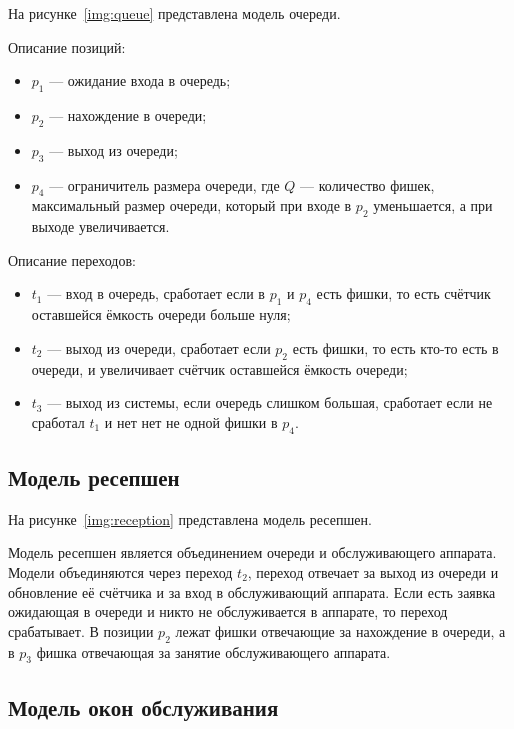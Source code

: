 На рисунке~\ref{img:queue} представлена модель очереди.

\FloatBarrier

Описание позиций:
\begin{itemize}[label=---]
	\item $p_1$ --- ожидание входа в очередь;
	\item $p_2$ --- нахождение в очереди;
	\item $p_3$ --- выход из очереди;
	\item $p_4$ --- ограничитель размера очереди, где $Q$ --- количество фишек, максимальный размер очереди, который при входе в $p_2$ уменьшается, а при выходе увеличивается.
\end{itemize}

Описание переходов:
\begin{itemize}[label=---]
	\item $t_1$ --- вход в очередь, сработает если в $p_1$ и $p_4$ есть фишки, то есть счётчик оставшейся ёмкость очереди больше нуля;
	\item $t_2$ --- выход из очереди, сработает если $p_2$ есть фишки, то есть кто-то есть в очереди, и увеличивает счётчик оставшейся ёмкость очереди;
	\item $t_3$ --- выход из системы, если очередь слишком большая, сработает если не сработал $t_1$ и нет нет не одной фишки в $p_4$.
\end{itemize}

\subsection{Модель ресепшен}

На рисунке~\ref{img:reception} представлена модель ресепшен.

\FloatBarrier

Модель ресепшен является объединением очереди и обслуживающего аппарата. Модели объединяются через переход $t_2$, переход отвечает за выход из очереди и обновление её счётчика и за вход в обслуживающий аппарата. Если есть заявка ожидающая в очереди и никто не обслуживается в аппарате, то переход срабатывает. В позиции $p_2$ лежат фишки отвечающие за нахождение в очереди, а в $p_3$ фишка отвечающая за занятие обслуживающего аппарата.

\subsection{Модель окон обслуживания}

